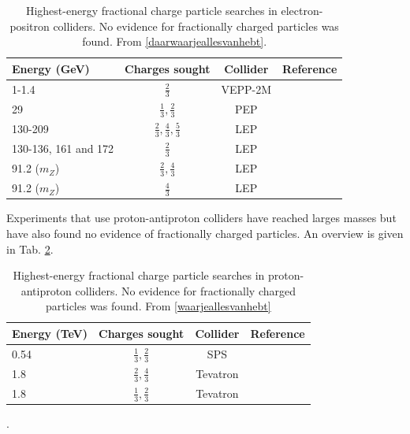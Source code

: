 \begin{table}[]
\label{tab:elecposcollider}
\centering
\begin{tabular}{|l|c|c|c|}
\hline
\rowcolor[HTML]{9B9B9B} 
Energy (GeV) & Charges sought                        & Collider &Reference\\ \hline \hline
1-1.4		 & $\frac{2}{3}$						 & VEPP-2M  & \cite{Bondar:1985sb} \\ \hline
29			 & $\frac{1}{3},\frac{2}{3}$			 & PEP & \cite{Aihara:1984px} \\ \hline		
130-209      & $\frac{2}{3},\frac{4}{3},\frac{5}{3}$ & LEP & \cite{Abbiendi:2003yd}    \\ \hline
130-136, 161 and 172 & $\frac{2}{3}$                 & LEP & \cite{Abreu:1996py}    \\ \hline
91.2 ($m_Z$) & $\frac{2}{3},\frac{4}{3}$             & LEP & \cite{Akers:1995az}    \\ \hline
91.2 ($m_Z$) & $\frac{4}{3}$   	    			     & LEP & \cite{Buskulic:1992mr}  \\ \hline
\end{tabular}
\caption{Highest-energy fractional charge particle searches in electron-positron colliders. No evidence for fractionally charged particles was found. From \ref{daarwaarjeallesvanhebt}.}
\end{table}

Experiments that use proton-antiproton colliders have reached larges masses but have also found no evidence of fractionally charged particles. An overview is given in Tab. \ref{tab:protonantiprotoncollider}.


\begin{table}[]
\label{tab:protonantiprotoncollider}
\centering
\begin{tabular}{|l|c|c|c|}
\hline
\rowcolor[HTML]{9B9B9B} 
Energy (TeV) & Charges sought            & Collider & Reference \\ \hline
0.54		 & $\frac{1}{3},\frac{2}{3}$ & SPS      & \cite{Banner:1985ev} \\ \hline
1.8          & $\frac{2}{3},\frac{4}{3}$ & Tevatron & \cite{Abe:1992vr}         \\ \hline
1.8          & $\frac{1}{3},\frac{2}{3}$ & Tevatron & \cite{Acosta:2002ju} \\ \hline
\end{tabular}
\caption{Highest-energy fractional charge particle searches in proton-antiproton colliders. No evidence for fractionally charged particles was found. From \ref{waarjeallesvanhebt}}.
\end{table}

